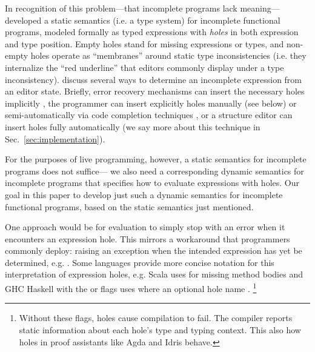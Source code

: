 In recognition of this problem---that incomplete programs lack meaning---%
\citet{popl-paper} developed a static semantics (i.e. a type system) for incomplete 
functional programs, modeled formally as typed expressions with \emph{holes} in 
both expression and type position. 
Empty holes stand for missing expressions or types,
and non-empty holes operate as ``membranes'' around static type inconsistencies 
(i.e. they internalize the ``red underline'' that editors commonly display under a type inconsistency).
\citet{popl-paper,HazelnutSNAPL} discuss several ways to determine an incomplete expression from an editor state. 
Briefly, error recovery mechanisms can insert the necessary holes implicitly \cite{DBLP:journals/siamcomp/AhoP72,charles1991practical,graham1979practical,DBLP:conf/oopsla/KatsJNV09,DBLP:conf/oopsla/KatsV10},
the programmer can insert explicitly holes manually (see below) 
or semi-automatically via code completion techniques \cite{Amorim2016}, 
or a structure editor can insert holes fully automatically \cite{popl-paper} (we say more about this technique in Sec.~\ref{sec:implementation}).

For the purposes of live programming, however, a static semantics for incomplete programs does not suffice---%
we also need a corresponding dynamic semantics for incomplete programs that specifies how to evaluate expressions with holes. 
Our goal in this paper \IS to develop just such a dynamic semantics for incomplete functional programs, 
based on the static semantics just mentioned.

One approach would be for evaluation to simply stop with an error when it encounters an expression hole.
This mirrors a workaround that programmers commonly deploy: 
raising an exception when the intended expression has yet be determined, e.g. . 
Some languages provide more concise notation for this interpretation of expression holes, 
e.g. Scala uses  for missing method bodies 
and GHC Haskell with the  or  flags uses  where  \IS an optional hole name \cite{GHCWIKI}.%
\footnote{Without these flags, holes cause compilation to fail. The compiler reports static information about each hole's type and typing context. 
This \IS also how holes in proof assistants like Agda \cite{norell:thesis,norell2009dependently} and Idris \cite{brady2013idris} behave.}

